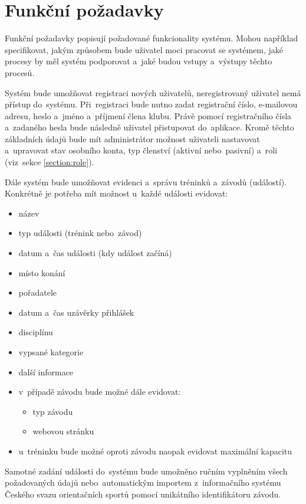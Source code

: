 \section{Funkční požadavky}
Funkční požadavky popisují požadované funkcionality systému. Mohou například specifikovat, jakým způsobem bude uživatel moci pracovat se systémem, jaké procesy by měl systém podporovat a~jaké budou vstupy a~výstupy těchto procesů. \cite{requirements}

\begin{enumerate}[label=\textcolor{decoration}{\textbf{F\arabic*}}, leftmargin=6mm]
	Systém bude umožňovat registraci nových uživatelů, neregistrovaný uživatel nemá přístup do~systému. Při~registraci bude nutno zadat registrační číslo, e-mailovou adresu, heslo a~jméno a~příjmení člena klubu. Právě pomocí registračního čísla a~zadaného hesla bude následně uživatel přistupovat do~aplikace. Kromě těchto základních údajů bude mít administrátor možnost uživateli nastavovat a~upravovat stav osobního konta, typ členství (aktivní nebo~pasivní) a~roli (viz~sekce \ref{section:role}).

	Dále systém bude umožňovat evidenci a~správu tréninků a~závodů (událostí). Konkrétně je potřeba mít možnost u~každé události evidovat:
	\begin{itemize}
		\item název
		\item typ události (trénink nebo~závod)
		\item datum a~čas události (kdy událost začíná)
		\item místo konání
		\item pořadatele
		\item datum a~čas uzávěrky přihlášek
		\item disciplínu
		\item vypsané kategorie
		\item další informace
		\item v~případě závodu bude možné dále evidovat:
		\begin{itemize}
			\item typ závodu
			\item webovou stránku
		\end{itemize}
		\item u~tréninku bude možné oproti závodu naopak evidovat maximální kapacitu
	\end{itemize}

	Samotné zadání události do~systému bude umožněno ručním vyplněním všech požadovaných údajů nebo~automatickým importem z~informačního systému Českého svazu orientačních sportů pomocí unikátního identifikátoru závodu.


\end{enumerate}
